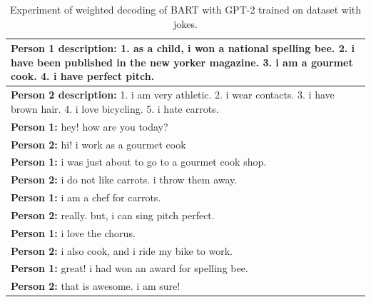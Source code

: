 \begin{table}[ht]
\centering
 \begin{tabular}{|p{14cm}|} 
 \hline
 \textbf{Person 1 description:} 1. as a child, i won a national spelling bee. 2. i have been published in the new yorker magazine. 3. i am a gourmet cook. 4. i have perfect pitch. \\
 \hline
 \textbf{Person 2 description:} 1. i am very athletic. 2. i wear contacts. 3. i have brown hair. 4. i love bicycling. 5. i hate carrots. \\
 \hline
 \textbf{Person 1:} hey! how are you today? \\ 
 \textbf{Person 2:} hi! i work as a gourmet cook \\
 \textbf{Person 1:} i was just about to go to a gourmet cook shop. \\
 \textbf{Person 2:} i do not like carrots. i throw them away. \\
 \textbf{Person 1:} i am a chef for carrots.\\
 \textbf{Person 2:} really. but, i can sing pitch perfect. \\
 \textbf{Person 1:} i love the chorus. \\
 \textbf{Person 2:} i also cook, and i ride my bike to work. \\
 \textbf{Person 1:} great! i had won an award for spelling bee.\\
 \textbf{Person 2:} that is awesome. i am sure! \\
 \hline
 \end{tabular}
 \caption{Experiment of weighted decoding of BART with GPT-2 trained on dataset with jokes.}
\label{tab:combo_bart_gpt2_jokes}
\end{table}

